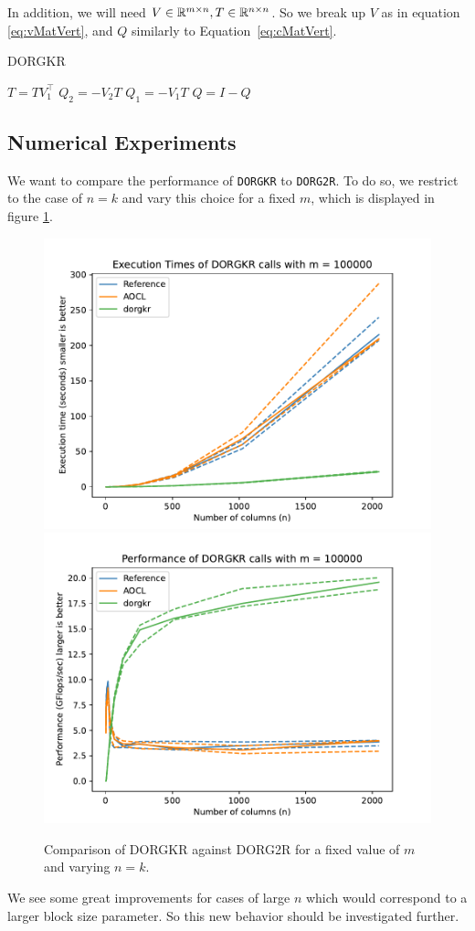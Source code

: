 \documentclass[12pt]{article}
\begin{document}
    In addition, we will need $V\in\mathbb{R}^{m\times n}, T\in\mathbb{R}^{n\times n}$. So we break up $V$ as in equation 
    \ref{eq:vMatVert}, and $Q$ similarly to Equation~\ref{eq:cMatVert}.
    \begin{algorithm}
        \caption{DORGKR}\label{alg:dorgkr}
        \begin{algorithmic}[1]
            \STATE $T = TV_1^\top$
            \STATE $Q_2 = -V_2T$
            \STATE $Q_1 = -V_1T$
            \STATE $Q = I - Q$
        \end{algorithmic}
    \end{algorithm}
    \subsection{Numerical Experiments}
    We want to compare the performance of \verb|DORGKR| to \verb|DORG2R|. To do so, we restrict to the case of 
    $n=k$ and vary this choice for a fixed $m$, which is displayed in figure \ref{fig:DORGKR}.

    \begin{figure}
        \centering
        \includegraphics[width=.45\textwidth]{figures/timeDORGKR.pdf}
        \includegraphics[width=.45\textwidth]{figures/flopDORGKR.pdf}
        \caption{Comparison of DORGKR against DORG2R for a fixed value of $m$ and varying $n=k$.}\label{fig:DORGKR}
    \end{figure}

    We see some great improvements for cases of large $n$ which would correspond to a larger block size parameter.
    So this new behavior should be investigated further.
\end{document}
